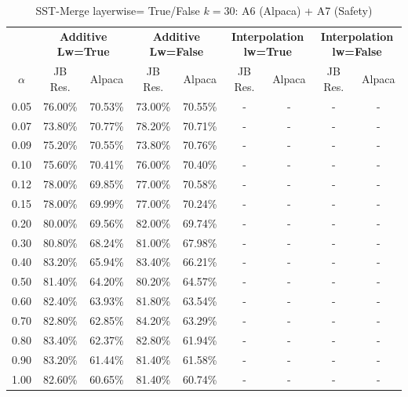 \begin{table}[h]
\centering
\caption{SST-Merge layerwise= True/False $k=30$: A6 (Alpaca) + A7 (Safety)}
\label{tab:res_a6_sst_30}
\begin{tabular}{c|cc|cc|cc|cc}
\hline
 & \multicolumn{2}{c|}{\textbf{Additive Lw=True}} & \multicolumn{2}{c|}{\textbf{Additive Lw=False}} & \multicolumn{2}{c|}{\textbf{Interpolation lw=True}}& \multicolumn{2}{c}{\textbf{Interpolation lw=False}} \\
$\alpha$ & JB Res. & Alpaca & JB Res. & Alpaca & JB Res. & Alpaca & JB Res. & Alpaca \\
\hline
0.05 & 76.00\% & 70.53\% & 73.00\% & 70.55\% & - & - & - & - \\
0.07 & 73.80\% & 70.77\% & 78.20\% & 70.71\% & - & - & - & - \\
0.09 & 75.20\% & 70.55\% & 73.80\% & 70.76\% & - & - & - & - \\
0.10 & 75.60\% & 70.41\% & 76.00\% & 70.40\% & - & - & - & - \\
0.12 & 78.00\% & 69.85\% & 77.00\% & 70.58\% & - & - & - & - \\
0.15 & 78.00\% & 69.99\% & 77.00\% & 70.24\% & - & - & - & - \\
0.20 & 80.00\% & 69.56\% & 82.00\% & 69.74\% & - & - & - & - \\
0.30 & 80.80\% & 68.24\% & 81.00\% & 67.98\% & - & - & - & - \\
0.40 & 83.20\% & 65.94\% & 83.40\% & 66.21\% & - & - & - & - \\
0.50 & 81.40\% & 64.20\% & 80.20\% & 64.57\% & - & - & - & - \\
0.60 & 82.40\% & 63.93\% & 81.80\% & 63.54\% & - & - & - & - \\
0.70 & 82.80\% & 62.85\% & 84.20\% & 63.29\% & - & - & - & - \\
0.80 & 83.40\% & 62.37\% & 82.80\% & 61.94\% & - & - & - & - \\
0.90 & 83.20\% & 61.44\% & 81.40\% & 61.58\% & - & - & - & - \\
1.00 & 82.60\% & 60.65\% & 81.40\% & 60.74\% & - & - & - & - \\
\hline
\end{tabular}
\end{table}
\FloatBarrier

